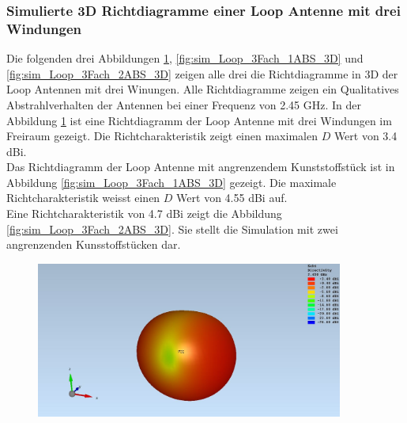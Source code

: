 \subsubsection{Simulierte 3D Richtdiagramme einer Loop Antenne mit drei Windungen}
Die folgenden drei Abbildungen \ref{fig:sim_Loop_3Fach_freiraum_3D}, \ref{fig:sim_Loop_3Fach_1ABS_3D} und \ref{fig:sim_Loop_3Fach_2ABS_3D} zeigen alle drei die Richtdiagramme in 3D der Loop Antennen mit drei Winungen. Alle Richtdiagramme zeigen ein Qualitatives Abstrahlverhalten der Antennen bei einer Frequenz von 2.45 GHz.
In der Abbildung \ref{fig:sim_Loop_3Fach_freiraum_3D} ist eine Richtdiagramm der Loop Antenne mit drei Windungen im Freiraum gezeigt. Die Richtcharakteristik zeigt einen maximalen $D$ Wert  von 3.4 dBi.\\
Das Richtdiagramm der Loop Antenne mit angrenzendem Kunststoffstück ist in Abbildung \ref{fig:sim_Loop_3Fach_1ABS_3D} gezeigt. Die maximale Richtcharakteristik weisst einen $D$ Wert von 4.55 dBi auf.\\
Eine Richtcharakteristik von 4.7 dBi zeigt die Abbildung \ref{fig:sim_Loop_3Fach_2ABS_3D}. Sie stellt die Simulation mit zwei angrenzenden Kunsstoffstücken dar.
\begin{figure}[h]
	\begin{center}
		\includegraphics[width=0.9\textwidth]{content/bilder/Evaluation/Loop/ohneABS/EM_Far_Field_Loop_Coil_ohneABS.JPG}
		\label{fig:sim_Loop_3Fach_freiraum_3D}
	\end{center}
\end{figure}
